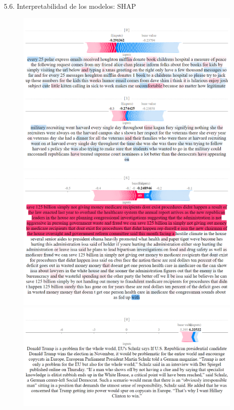 \begin{frame}{5.6. Interpretabilidad de los modelos: SHAP}
\begin{figure}
        \includegraphics[width=\textwidth]{figs/one-distil-b-ml-c.png}
    \endminipage\hfill %
        \includegraphics[width=\textwidth]{figs/all-distil-b-ml-c.png}
    \endminipage\hfill %
        \includegraphics[width=\linewidth]{figs/news-distil-b-ml-c.png}
    \endminipage
    

\end{figure}
\end{frame}
